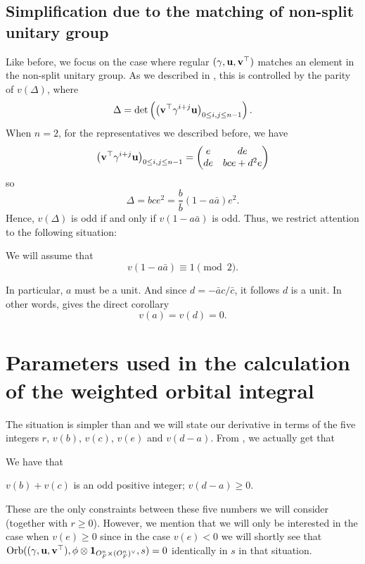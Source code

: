 \subsection{Simplification due to the matching of non-split unitary group}
Like before, we focus on the case where regular $(\gamma, \mathbf u, \mathbf v^\top)$
matches an element in the non-split unitary group.
As we described in ,
this is controlled by the parity of $v(\Delta)$, where
\[ \Delta = \det \left( \left( \mathbf v^\top \gamma^{i+j} \mathbf u \right)_{0 \le i,j \le n-1} \right). \]
When $n=2$, for the representatives we described before,
we have
\[ \left( \mathbf v^\top \gamma^{i+j} \mathbf u \right)_{0 \le i,j \le n-1}
  = \begin{pmatrix} e & de \\ de & bce + d^2e \end{pmatrix} \]
so
\[ \Delta = bce^2 = \frac{b}{\bar b}(1-a \bar a) e^2 . \]
Hence, $v(\Delta)$ is odd if and only if $v(1-a \bar a)$ is odd.
Thus, we restrict attention to the following situation:
\begin{assume}
  \label{assume:a_odd}
  We will assume that
  \[ v(1-a \bar a) \equiv 1 \pmod 2. \]
\end{assume}
In particular, $a$ must be a unit.
And since $d = -\bar a c / \bar c$, it follows $d$ is a unit.
In other words,  gives the direct corollary
\[ v(a) = v(d) = 0. \]

\section{Parameters used in the calculation of the weighted orbital integral}
The situation is simpler than 
and we will state our derivative in terms of the five integers
$r$, $v(b)$, $v(c)$, $v(e)$ and $v(d-a)$.
From , we actually get that
\begin{assume}
  \label{assume:FJ}
  We have that
  \begin{itemize}
    \ii $v(b) + v(c)$ is an odd positive integer;
    \ii $v(d-a) \ge 0$.
  \end{itemize}
\end{assume}
These are the only constraints between these five numbers we will consider
(together with $r \ge 0$).
However, we mention that we will only be interested in the case when $v(e) \ge 0$
since in the case $v(e) < 0$ we will shortly see that
$\operatorname{Orb}({(\gamma, \mathbf u, \mathbf v^\top)}, \phi \otimes \mathbf{1}_{O_F^n \times (O_F^n)^\vee}, s) = 0$ identically in $s$ in that situation.

